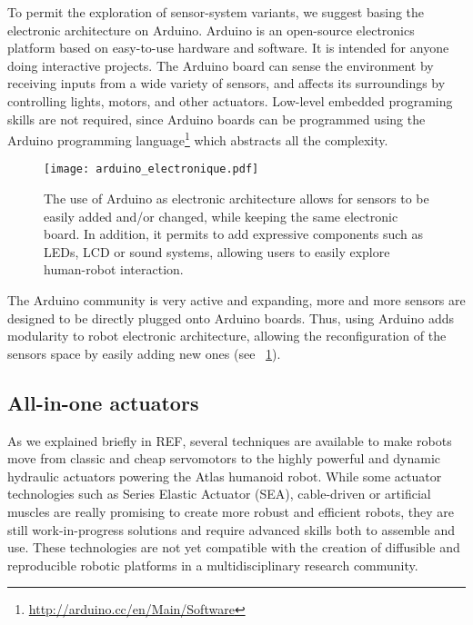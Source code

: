 To permit the exploration of sensor-system variants, we suggest basing the electronic architecture on Arduino. Arduino is an open-source electronics platform based on easy-to-use hardware and software. It is intended for anyone doing interactive projects. The Arduino board can sense the environment by receiving inputs from a wide variety of sensors, and affects its surroundings by controlling lights, motors, and other actuators. Low-level embedded programing skills are not required, since Arduino boards can be programmed using the Arduino programming language\footnote{\url{http://arduino.cc/en/Main/Software}} which abstracts all the complexity.

\begin{figure}[tb]
    \begin{center}
        \texttt{[image: arduino\_electronique.pdf]}
    \end{center}
    \caption{The use of Arduino as electronic architecture  allows for sensors to be easily added and/or changed, while keeping the same electronic board. In addition, it permits to add expressive components such as LEDs, LCD or sound systems, allowing users to easily explore human-robot interaction.}
    \label{fig:arduino_modular_electronic}
\end{figure}


The Arduino community is very active and expanding, more and more sensors are designed to be directly plugged onto Arduino boards. Thus, using Arduino adds modularity to robot electronic architecture, allowing the reconfiguration of the sensors space by easily adding new ones (see \figurename~\ref{fig:arduino_modular_electronic}).


\subsection{All-in-one actuators} %

As we explained briefly in REF, several techniques are available to make robots move from classic and cheap servomotors to the highly powerful and dynamic hydraulic actuators powering the Atlas humanoid robot.
While some actuator technologies such as Series Elastic Actuator (SEA), cable-driven or artificial muscles are really promising to create more robust and efficient robots, they are still work-in-progress solutions and require advanced skills both to assemble and use. These technologies are not yet compatible with the creation of diffusible and reproducible robotic platforms in a multidisciplinary research community.

